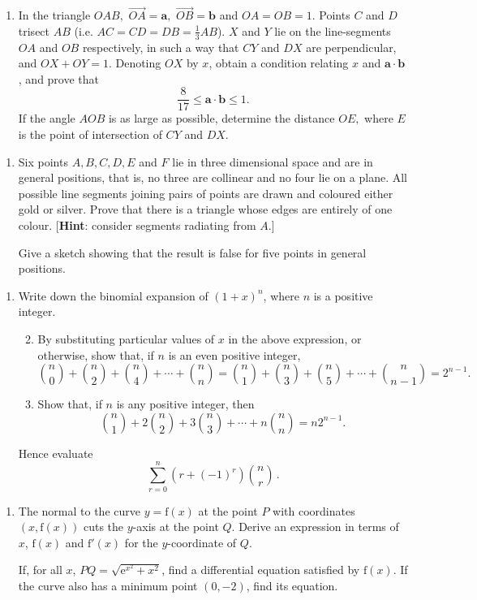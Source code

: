 \documentclass[a4, 11pt]{report}
\newlength{\qspace}
\newcounter{qnumber}
\newenvironment{question}%
 {\vspace{\qspace}
  \begin{enumerate}[\bfseries 1\quad][10]%
    \setcounter{enumi}{\value{qnumber}}%
    \item%
 }
{
  \end{enumerate}
  \filbreak
  \stepcounter{qnumber}
 }
\newenvironment{questionparts}[1][1]%
 {
  \begin{enumerate}[\bfseries (i)]%
    \setcounter{enumii}{#1}
    \addtocounter{enumii}{-1}
    \setlength{\itemsep}{5mm}
    \setlength{\parskip}{8pt}
 }
 {
  \end{enumerate}
 }
\begin{document}
\begin{question}
In the triangle $OAB,$ $\overrightarrow{OA}=\mathbf{a},$ $\overrightarrow{OB}=\mathbf{b}$
and $OA=OB=1$. Points $C$ and $D$ trisect $AB$ (i.e. $AC=CD=DB=\frac{1}{3}AB$).
$X$ and $Y$ lie on the line-segments $OA$ and $OB$ respectively,
in such a way that $CY$ and $DX$ are perpendicular, and $OX+OY=1$.
Denoting $OX$ by $x$, obtain a condition relating $x$ and $\mathbf{a\cdot b}$,
and prove that 
\[
\frac{8}{17}\leqslant\mathbf{a\cdot b}\leqslant1.
\]
If the angle $AOB$ is as large as possible, determine the distance
$OE,$ where $E$ is the point of intersection of $CY$ and $DX$. 
\end{question}



\begin{question}
Six points $A,B,C,D,E$ and $F$ lie in three dimensional space and
are in general positions, that is, no three are collinear and no four
lie on a plane. All possible line segments joining pairs of points
are drawn and coloured either gold or silver. Prove that there is
a triangle whose edges are entirely of one colour. {[}\textbf{Hint}:
consider segments radiating from $A.${]}


Give a sketch showing that the result is false for five points in
general positions. 
\end{question}


\begin{question}
Write down the binomial expansion of $(1+x)^{n}$, where $n$ is a
positive integer. 

\begin{questionparts}
\item By substituting particular values of $x$ in the above expression,
or otherwise, show that, if $n$ is an even positive integer, 
\[
\binom{n}{0}+\binom{n}{2}+\binom{n}{4}+\cdots+\binom{n}{n}=\binom{n}{1}+\binom{n}{3}+\binom{n}{5}+\cdots+\binom{n}{n-1}=2^{n-1}.
\]

\item Show that, if $n$ is any positive integer, then 
\[
\binom{n}{1}+2\binom{n}{2}+3\binom{n}{3}+\cdots+n\binom{n}{n}=n2^{n-1}.
\]

\end{questionparts}

Hence evaluate 
\[
\sum_{r=0}^{n}\left(r+(-1)^{r}\right)\binom{n}{r}\,.
\]
\end{question}
	
	\begin{question}
The normal to the curve $y=\mathrm{f}(x)$ at the point $P$ with
coordinates $(x,\mathrm{f}(x))$ cuts the $y$-axis at the point $Q$.
Derive an expression in terms of $x$, $\mathrm{f}(x)$ and $\mathrm{f}'(x)$
for the $y$-coordinate of $Q$. 


If, for all $x$, $PQ=\sqrt{\mathrm{e}^{x^{2}}+x^{2}}$, find a differential
equation satisfied by $\mathrm{f}(x)$. If the curve also has a minimum
point $(0,-2)$, find its equation.
	 \end{question}
	 
\end{document}
